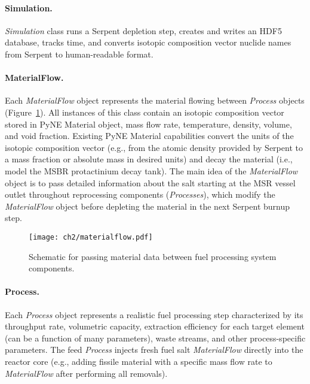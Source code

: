 \paragraph{Simulation.}\textit{Simulation} class runs a Serpent depletion 
step, creates and writes an HDF5 database, tracks time, and converts isotopic 
composition vector nuclide names from Serpent to human-readable format.
\paragraph{MaterialFlow.}Each \textit{MaterialFlow} object represents the 
material flowing between \textit{Process} objects  
(Figure~\ref{fig:matflow_obj}). All instances of this class 
contain an isotopic composition vector stored in PyNE Material object, mass 
flow rate, temperature, density, volume, and void fraction. Existing PyNE 
Material capabilities convert the units of the isotopic composition vector 
(e.g., from the atomic density provided by Serpent to a mass fraction or 
absolute mass in desired units) and decay the material (i.e., model the 
\gls{MSBR} protactinium decay tank). The main idea of the 
\textit{MaterialFlow} object is to pass detailed information about the salt 
starting at the \gls{MSR} vessel outlet throughout reprocessing components 
(\textit{Processes}), which modify the \textit{MaterialFlow} object before 
depleting the material in the next Serpent burnup step. 
\begin{figure}[ht!] %
	\centering
	\texttt{[image: ch2/materialflow.pdf]}
	\vspace{-0.1in}
	\caption{Schematic for passing material data between fuel processing 
		system components.}
	\label{fig:matflow_obj}
\end{figure}
\paragraph{Process.}Each \textit{Process} object represents a 
realistic fuel processing step characterized by its throughput rate, 
volumetric capacity, extraction efficiency for each target element (can be 
a function of many parameters), waste streams, and other process-specific 
parameters. The feed \textit{Process} injects fresh fuel salt 
\textit{MaterialFlow} directly into the reactor core (e.g., adding fissile 
material with a specific mass flow rate to \textit{MaterialFlow} after 
performing all removals).\\


